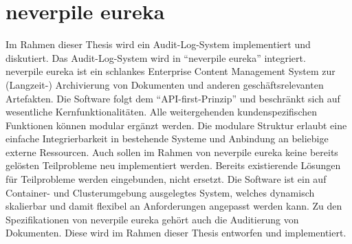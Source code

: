 \section{neverpile eureka}
Im Rahmen dieser Thesis wird ein Audit-Log-System implementiert und diskutiert. Das Audit-Log-System wird in "`neverpile eureka"' integriert.\\
neverpile eureka ist ein schlankes Enterprise Content Management System zur (Langzeit-) Archivierung von Dokumenten und anderen geschäftsrelevanten Artefakten. Die Software folgt dem "`\acs{API}-first-Prinzip"' und beschränkt sich auf wesentliche Kernfunktionalitäten. Alle weitergehenden kundenspezifischen Funktionen können modular ergänzt werden. Die modulare Struktur erlaubt eine einfache Integrierbarkeit in bestehende Systeme und Anbindung an beliebige externe Ressourcen. Auch sollen im Rahmen von neverpile eureka keine bereits gelösten Teilprobleme neu implementiert werden. Bereits existierende Lösungen für Teilprobleme werden eingebunden, nicht ersetzt. Die Software ist ein auf Container- und Clusterumgebung ausgelegtes System, welches dynamisch skalierbar und damit flexibel an Anforderungen angepasst werden kann. 
Zu den Spezifikationen von neverpile eureka gehört auch die Auditierung von Dokumenten. Diese wird im Rahmen dieser Thesis entworfen und implementiert.

